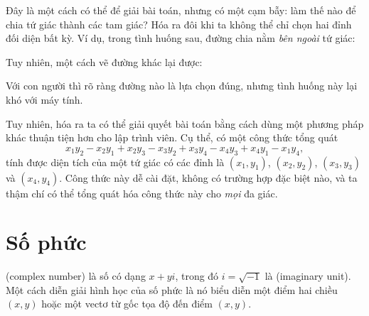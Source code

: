 Đây là một cách có thể để giải bài toán,
nhưng có một cạm bẫy:
làm thế nào để chia tứ giác thành các tam giác?
Hóa ra đôi khi ta không thể chỉ chọn 
hai đỉnh đối diện bất kỳ.
Ví dụ, trong tình huống sau,
đường chia nằm \emph{bên ngoài} tứ giác:
\begin{center}
\end{center}
Tuy nhiên, một cách vẽ đường khác lại được:
\begin{center}
\end{center}
Với con người thì rõ ràng đường nào là lựa chọn đúng,
nhưng tình huống này lại khó với máy tính.
                           
Tuy nhiên, hóa ra ta có thể giải quyết bài toán bằng cách dùng
một phương pháp khác thuận tiện hơn cho lập trình viên.
Cụ thể, có một công thức tổng quát
\[x_1y_2-x_2y_1+x_2y_3-x_3y_2+x_3y_4-x_4y_3+x_4y_1-x_1y_4,\]
tính được diện tích của một tứ giác
có các đỉnh là
$(x_1,y_1)$,
$(x_2,y_2)$,
$(x_3,y_3)$ và
$(x_4,y_4)$.
Công thức này dễ cài đặt, không có trường hợp
đặc biệt nào, và ta thậm chí có thể tổng quát hóa công thức này
cho \emph{mọi} đa giác.

\section{Số phức}


 (complex number) là số có dạng $x+y i$,
trong đó $i = \sqrt{-1}$ là  (imaginary unit).
Một cách diễn giải hình học của số phức là
nó biểu diễn một điểm hai chiều $(x,y)$
hoặc một vectơ từ gốc tọa độ đến điểm $(x,y)$.

